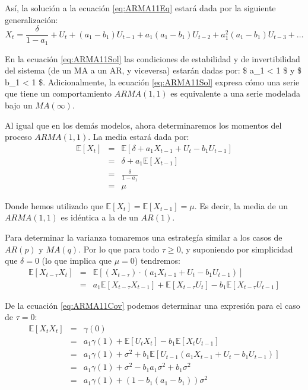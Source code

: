 \documentclass[
]{book}
\begin{document}
Así, la solución a la ecuación \eqref{eq:ARMA11Eq} estará dada por la siguiente generalización:
\begin{equation}
    X_t = \frac{\delta}{1 - a_1} + U_t + (a_1 - b_1) U_{t - 1} + a_1(a_1 - b_1) U_{t - 2} + a_1^2(a_1 - b_1) U_{t - 3} + \ldots
    \label{eq:ARMA11Sol}
\end{equation}

En la ecuación \eqref{eq:ARMA11Sol} las condiciones de estabilidad y de invertibilidad del sistema (de un MA a un AR, y viceversa) estarán dadas por: \$ \textbar{} a\_1 \textbar{} \textless{} 1 \$ y \$ \textbar{} b\_1 \textbar{} \textless{} 1 \$. Adicionalmente, la ecuación \eqref{eq:ARMA11Sol} expresa cómo una serie que tiene un comportamiento \(ARMA(1, 1)\) es equivalente a una serie modelada bajo un \(MA(\infty)\).

Al igual que en los demás modelos, ahora determinaremos los momentos del proceso \(ARMA(1, 1)\). La media estará dada por:
\begin{eqnarray}
    \mathbb{E}[X_t] & = & \mathbb{E}[\delta + a_1 X_{t-1} + U_t - b_1 U_{t-1}] \nonumber \\
    & = & \delta + a_1 \mathbb{E}[X_{t-1}] \nonumber \\
    & = & \frac{\delta}{1 - a_1} \nonumber \\
    & = & \mu
\end{eqnarray}

Donde hemos utilizado que \(\mathbb{E}[X_t] = \mathbb{E}[X_{t-1}] = \mu\). Es decir, la media de un \(ARMA(1, 1)\) es idéntica a la de un \(AR(1)\).

Para determinar la varianza tomaremos una estrategía similar a los casos de \(AR(p)\) y \(MA(q)\). Por lo que para todo \(\tau \geq 0\), y suponiendo por simplicidad que \(\delta = 0\) (lo que implica que \(\mu = 0\)) tendremos:
\begin{eqnarray}
    \mathbb{E}[X_{t-\tau} X_t] & = & \mathbb{E}[(X_{t-\tau}) \cdot (a_1 X_{t-1} + U_t - b_1 U_{t-1})] \nonumber \\
    & = & a_1 \mathbb{E}[X_{t-\tau} X_{t-1}] + \mathbb{E}[X_{t-\tau} U_t] - b_1 \mathbb{E}[X_{t-\tau} U_{t-1}]
    \label{eq:ARMA11Cov}
\end{eqnarray}

De la ecuación \eqref{eq:ARMA11Cov} podemos determinar una expresión para el caso de \(\tau = 0\):
\begin{eqnarray}
    \mathbb{E}[X_{t} X_t] & = & \gamma(0) \nonumber \\
    & = & a_1 \gamma(1) + \mathbb{E}[U_t X_t] - b_1 \mathbb{E}[X_t U_{t-1}] \nonumber \\
    & = & a_1 \gamma(1) + \sigma^2 + b_1 \mathbb{E}[U_{t-1} (a_1 X_{t-1} + U_t - b_1 U_{t-1})] \nonumber \\
    & = & a_1 \gamma(1) + \sigma^2 - b_1 a_1 \sigma^2 + b_1 \sigma^2 \nonumber \\
    & = & a_1 \gamma(1) + (1 - b_1 (a_1 - b_1)) \sigma^2
\end{eqnarray}
\end{document}
